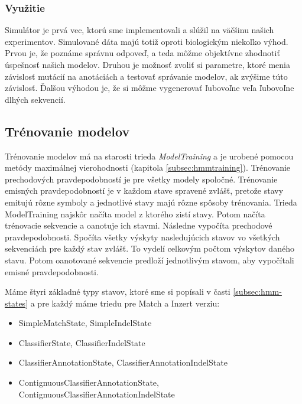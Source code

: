 \subsubsection{Využitie}

Simulátor je prvá vec, ktorú sme implementovali a slúžil na väčšinu našich experimentov. Simulované dáta majú totiž oproti biologickým niekoľko výhod. Prvou je, že poznáme správnu odpoveď, a teda môžme objektívne zhodnotiť úspešnosť našich modelov. Druhou je možnosť zvoliť si parametre, ktoré menia závislosť mutácií na anotáciách a testovať správanie modelov, ak zvýšime túto závislosť. Ďalšou výhodou je, že si môžme vygenerovať ľubovoľne veľa ľubovoľne dlhých sekvencií.

\subsection{Trénovanie modelov}
\label{subsec:impl-model-traioning}

Trénovanie modelov má na starosti trieda \textit{ModelTraining} a je urobené pomocou metódy maximálnej vierohodnosti (kapitola \ref{subsec:hmmtraining}).
Trénovanie prechodových pravdepodobností je pre všetky modely spoločné. Trénovanie emisných pravdepodobností je v každom stave spravené zvlášť, pretože stavy emitujú rôzne symboly a jednotlivé stavy majú rôzne spôsoby trénovania.
Trieda ModelTraining najskôr načíta model z ktorého zistí stavy.
Potom načíta trénovacie sekvencie a oanotuje ich stavmi. Následne vypočíta prechodové pravdepodobnosti. Spočíta všetky výskyty nasledujúcich stavov vo všetkých sekvenciách pre každý stav zvlášť. To vydelí celkovým počtom výskytov daného stavu. Potom oanotované sekvencie predloží jednotlivým stavom, aby vypočítali emisné pravdepodobnosti.

Máme štyri základné typy stavov, ktoré sme si popísali v časti \ref{subsec:hmm-states} a pre každý máme triedu pre Match a Inzert verziu:
\begin{itemize}
    \item SimpleMatchState, SimpleIndelState
    \item ClassifierState, ClassifierIndelState
    \item ClassifierAnnotationState, ClassifierAnnotationIndelState
    \item ContignuousClassifierAnnotationState, ContignuousClassifierAnnotationIndelState
\end{itemize}

